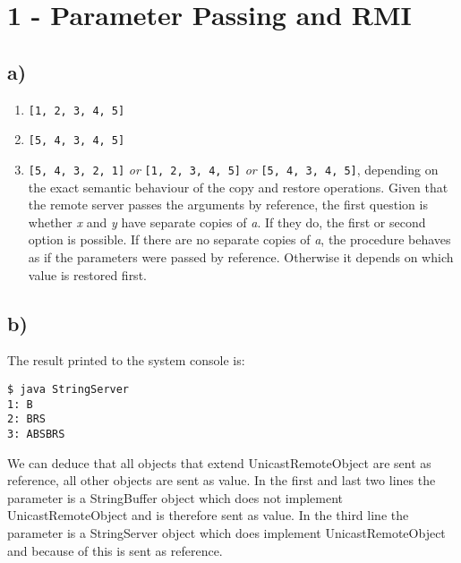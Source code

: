 \documentclass{scrartcl}
\author{Felix Bühler\\2973410 \and Clemens Lieb\\3130838 \and Steffen Wonner\\2862123 \and Fabian Bühler\\2953320}
\title{\gettitle}
\subtitle{\getsubtitle}
\begin{document}
\maketitle

\section*{1 - Parameter Passing and RMI}
\subsection*{a)}
\begin{enumerate}[label=(\roman*)]
	\item \texttt{[1, 2, 3, 4, 5]}
	\item \texttt{[5, 4, 3, 4, 5]}
	\item \texttt{[5, 4, 3, 2, 1]} \emph{or} \texttt{[1, 2, 3, 4, 5]} \emph{or} \texttt{[5, 4, 3, 4, 5]}, depending on the exact semantic behaviour of the copy and restore operations.
	Given that the remote server passes the arguments by reference, the first question is whether \textit{x} and \textit{y} have separate copies of \textit{a}. 
	If they do, the first or second option is possible. 
	If there are no separate copies of \textit{a}, the procedure behaves as if the parameters were passed by reference. 
	Otherwise it depends on which value is restored first.
\end{enumerate}

\subsection*{b)}

The result printed to the system console is:
\begin{verbatim}
$ java StringServer
1: B
2: BRS
3: ABSBRS
\end{verbatim}

We can deduce that all objects that extend UnicastRemoteObject are sent as reference, all other objects are sent as value.
In the first and last two lines the parameter is a StringBuffer object which does not implement UnicastRemoteObject and is therefore sent as value. 
In the third line the parameter is a StringServer object which does implement UnicastRemoteObject and because of this is sent as reference.
\end{document}

